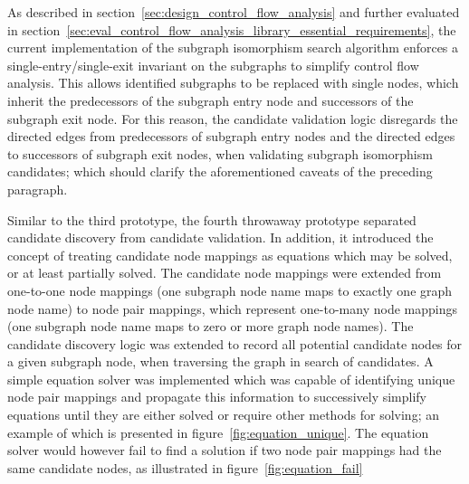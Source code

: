 As described in section~\ref{sec:design_control_flow_analysis} and further evaluated in section~\ref{sec:eval_control_flow_analysis_library_essential_requirements}, the current implementation of the subgraph isomorphism search algorithm enforces a single-entry/single-exit invariant on the subgraphs to simplify control flow analysis. This allows identified subgraphs to be replaced with single nodes, which inherit the predecessors of the subgraph entry node and successors of the subgraph exit node. For this reason, the candidate validation logic disregards the directed edges from predecessors of subgraph entry nodes and the directed edges to successors of subgraph exit nodes, when validating subgraph isomorphism candidates; which should clarify the aforementioned caveats of the preceding paragraph.

Similar to the third prototype, the fourth throwaway prototype separated candidate discovery from candidate validation. In addition, it introduced the concept of treating candidate node mappings as equations which may be solved, or at least partially solved. The candidate node mappings were extended from one-to-one node mappings (one subgraph node name maps to exactly one graph node name) to node pair mappings, which represent one-to-many node mappings (one subgraph node name maps to zero or more graph node names). The candidate discovery logic was extended to record all potential candidate nodes for a given subgraph node, when traversing the graph in search of candidates. A simple equation solver was implemented which was capable of identifying unique node pair mappings and propagate this information to successively simplify equations until they are either solved or require other methods for solving; an example of which is presented in figure~\ref{fig:equation_unique}. The equation solver would however fail to find a solution if two node pair mappings had the same candidate nodes, as illustrated in figure~\ref{fig:equation_fail}

